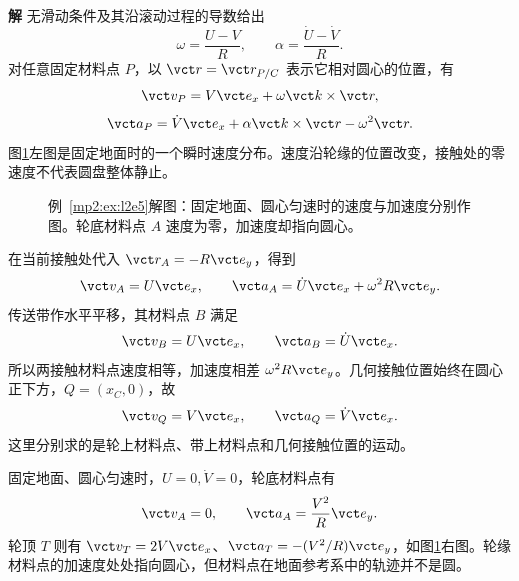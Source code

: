 \documentclass[11pt,openany,fontset=fandol]{ctexbook}
\theoremstyle{definition}\newtheorem{example}{例}[chapter]\newtheorem{exercise}{习题}[chapter]
\newcommand{\SolutionStart}{\par\medskip\ifdim\pagetotal>0pt\ifdim\dimexpr\pagegoal-\pagetotal\relax<3\baselineskip\newpage\fi\fi\noindent\textbf{解}\quad\ignorespaces}
\newenvironment{solution}{\SolutionStart}{\par\medskip}
\begin{document}
\begin{solution}
无滑动条件及其沿滚动过程的导数给出
\[
\omega=\frac{U-V}{R},\qquad \alpha=\frac{\dot U-\dot V}{R}.
\]
对任意固定材料点 $P$，以 $\vct r=\vct r_{P/C}$ 表示它相对圆心的位置，有
\[
\vct v_P=V\vct e_x+\omega\vct k\times\vct r,
\]
\[
\vct a_P=\dot V\vct e_x+\alpha\vct k\times\vct r-\omega^2\vct r.
\]
图\ref{mp2:fig:l2e5-s}左图是固定地面时的一个瞬时速度分布。速度沿轮缘的位置改变，接触处的零速度不代表圆盘整体静止。

\begin{figure}[H]\centering
{}
\caption{例~\ref{mp2:ex:l2e5}解图：固定地面、圆心匀速时的速度与加速度分别作图。轮底材料点 $A$ 速度为零，加速度却指向圆心。}\label{mp2:fig:l2e5-s}
\end{figure}

在当前接触处代入 $\vct r_A=-R\vct e_y$，得到
\[
\vct v_A=U\vct e_x,\qquad
\vct a_A=\dot U\vct e_x+\omega^2R\vct e_y.
\]
传送带作水平平移，其材料点 $B$ 满足
\[
\vct v_B=U\vct e_x,\qquad \vct a_B=\dot U\vct e_x.
\]
所以两接触材料点速度相等，加速度相差 $\omega^2R\vct e_y$。几何接触位置始终在圆心正下方，$Q=(x_C,0)$，故
\[
\vct v_Q=V\vct e_x,\qquad \vct a_Q=\dot V\vct e_x.
\]
这里分别求的是轮上材料点、带上材料点和几何接触位置的运动。

固定地面、圆心匀速时，$U=0,\dot V=0$，轮底材料点有
\[
\vct v_A=0,\qquad \vct a_A=\frac{V^2}{R}\vct e_y.
\]
轮顶 $T$ 则有 $\vct v_T=2V\vct e_x$、$\vct a_T=-(V^2/R)\vct e_y$，如图\ref{mp2:fig:l2e5-s}右图。轮缘材料点的加速度处处指向圆心，但材料点在地面参考系中的轨迹并不是圆。

\end{solution}
\end{document}
